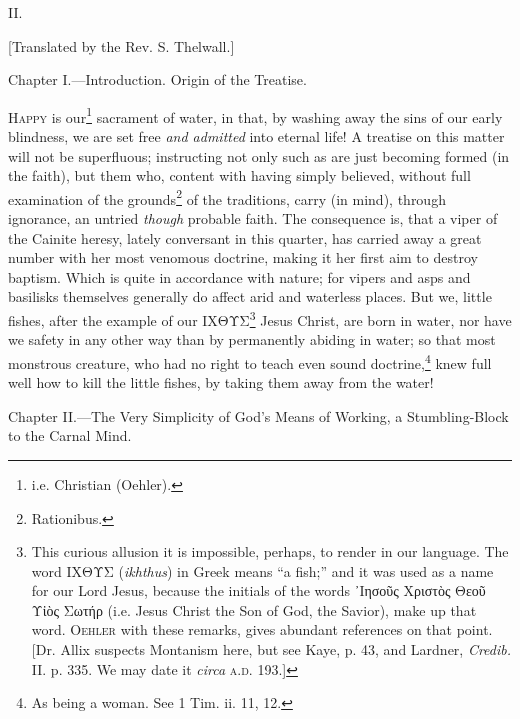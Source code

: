 

II.

[Translated by the Rev. S. Thelwall.]

Chapter I.—Introduction. Origin of the Treatise.

\textsc{Happy} is our\footnote{i.e. Christian (Oehler).} sacrament of water, in that, by washing away the sins of our early blindness, we are set free \emph{and admitted} into eternal life! A treatise on this matter will not be superfluous; instructing not only such as are just becoming formed (in the faith), but them who, content with having simply believed, without full examination of the grounds\footnote{Rationibus.} of the traditions, carry (in mind), through ignorance, an untried \emph{though} probable faith. The consequence is, that a viper of the Cainite heresy, lately conversant in this quarter, has carried away a great number with her most venomous doctrine, making it her first aim to destroy baptism. Which is quite in accordance with nature; for vipers and asps and basilisks themselves generally do affect arid and waterless places. But we, little fishes, after the example of our \textgreek{ΙΧΘΥΣ}\footnote{This curious allusion it is impossible, perhaps, to render in our language. The word \textgreek{ΙΧΘΥΣ} (\emph{ikhthus}) in Greek means “a fish;” and it was used as a name for our Lord Jesus, because the initials of the words \textgreek{᾽Ιησοῦς Χριστὸς Θεοῦ Υἰὸς Σωτήρ} (i.e. Jesus Christ the Son of God, the Savior), make up that word. \textsc{Oehler} with these remarks, gives abundant references on that point. [Dr. Allix suspects Montanism here, but see Kaye, p. 43, and Lardner, \emph{Credib.} II. p. 335. We may date it \emph{circa} \textsc{a.d}. 193.]} Jesus Christ, are born in water, nor have we safety in any other way than by permanently abiding in water; so that most monstrous creature, who had no right to teach even sound doctrine,\footnote{As being a woman. See 1 Tim. ii. 11, 12.} knew full well how to kill the little fishes, by taking them away from the water!


Chapter II.—The Very Simplicity of God’s Means of Working, a Stumbling-Block to the Carnal Mind.

